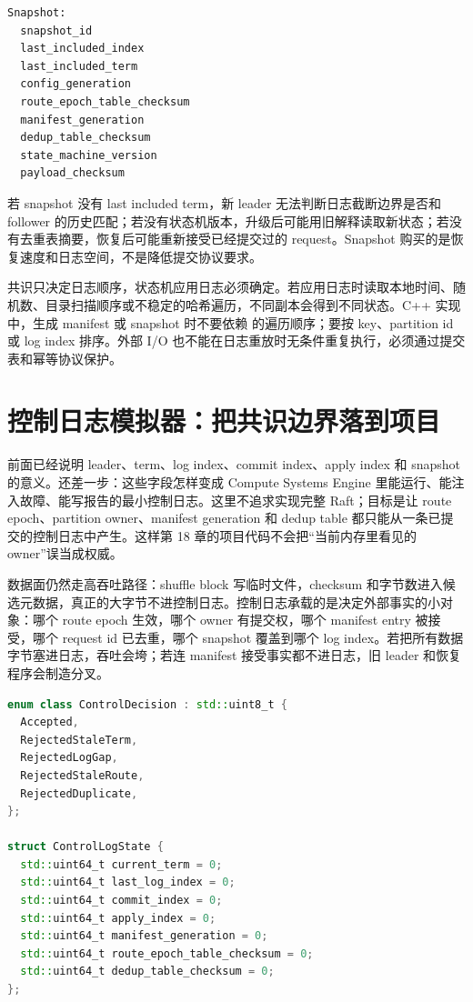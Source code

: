\begin{lstlisting}[numbers=none,caption={控制面 snapshot 的最小身份}]
Snapshot:
  snapshot_id
  last_included_index
  last_included_term
  config_generation
  route_epoch_table_checksum
  manifest_generation
  dedup_table_checksum
  state_machine_version
  payload_checksum
\end{lstlisting}

若 snapshot 没有 last included term，新 leader 无法判断日志截断边界是否和 follower 的历史匹配；若没有状态机版本，升级后可能用旧解释读取新状态；若没有去重表摘要，恢复后可能重新接受已经提交过的 request。Snapshot 购买的是恢复速度和日志空间，不是降低提交协议要求。

共识只决定日志顺序，状态机应用日志必须确定。若应用日志时读取本地时间、随机数、目录扫描顺序或不稳定的哈希遍历，不同副本会得到不同状态。C++ 实现中，生成 manifest 或 snapshot 时不要依赖  的遍历顺序；要按 key、partition id 或 log index 排序。外部 I/O 也不能在日志重放时无条件重复执行，必须通过提交表和幂等协议保护。

\section{控制日志模拟器：把共识边界落到项目}

前面已经说明 leader、term、log index、commit index、apply index 和 snapshot 的意义。还差一步：这些字段怎样变成 Compute Systems Engine 里能运行、能注入故障、能写报告的最小控制日志。这里不追求实现完整 Raft；目标是让 route epoch、partition owner、manifest generation 和 dedup table 都只能从一条已提交的控制日志中产生。这样第 18 章的项目代码不会把“当前内存里看见的 owner”误当成权威。

数据面仍然走高吞吐路径：shuffle block 写临时文件，checksum 和字节数进入候选元数据，真正的大字节不进控制日志。控制日志承载的是决定外部事实的小对象：哪个 route epoch 生效，哪个 owner 有提交权，哪个 manifest entry 被接受，哪个 request id 已去重，哪个 snapshot 覆盖到哪个 log index。若把所有数据字节塞进日志，吞吐会垮；若连 manifest 接受事实都不进日志，旧 leader 和恢复程序会制造分叉。

\begin{lstlisting}[language=C++,caption={控制日志模拟器的核心记录}]
enum class ControlDecision : std::uint8_t {
  Accepted,
  RejectedStaleTerm,
  RejectedLogGap,
  RejectedStaleRoute,
  RejectedDuplicate,
};

struct ControlLogState {
  std::uint64_t current_term = 0;
  std::uint64_t last_log_index = 0;
  std::uint64_t commit_index = 0;
  std::uint64_t apply_index = 0;
  std::uint64_t manifest_generation = 0;
  std::uint64_t route_epoch_table_checksum = 0;
  std::uint64_t dedup_table_checksum = 0;
};
\end{lstlisting}

